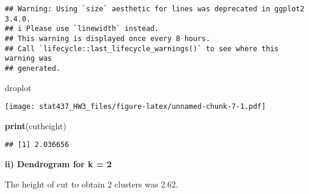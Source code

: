 \documentclass[
]{article}
\newenvironment{Shaded}{\begin{snugshade}}{\end{snugshade}}
\newcommand{\AttributeTok}[1]{\textcolor[rgb]{0.13,0.29,0.53}{#1}}
\newcommand{\CommentTok}[1]{\textcolor[rgb]{0.56,0.35,0.01}{\textit{#1}}}
\newcommand{\DecValTok}[1]{\textcolor[rgb]{0.00,0.00,0.81}{#1}}
\newcommand{\FloatTok}[1]{\textcolor[rgb]{0.00,0.00,0.81}{#1}}
\newcommand{\FunctionTok}[1]{\textcolor[rgb]{0.13,0.29,0.53}{\textbf{#1}}}
\newcommand{\NormalTok}[1]{#1}
\newcommand{\OtherTok}[1]{\textcolor[rgb]{0.56,0.35,0.01}{#1}}
\newcommand{\SpecialCharTok}[1]{\textcolor[rgb]{0.81,0.36,0.00}{\textbf{#1}}}
\newcommand{\StringTok}[1]{\textcolor[rgb]{0.31,0.60,0.02}{#1}}
\begin{document}
\begin{verbatim}
## Warning: Using `size` aesthetic for lines was deprecated in ggplot2 3.4.0.
## i Please use `linewidth` instead.
## This warning is displayed once every 8 hours.
## Call `lifecycle::last_lifecycle_warnings()` to see where this warning was
## generated.
\end{verbatim}

\begin{Shaded}
\begin{Highlighting}[]
\NormalTok{droplot}
\end{Highlighting}
\end{Shaded}

\texttt{[image: stat437\_HW3\_files/figure-latex/unnamed-chunk-7-1.pdf]}

\begin{Shaded}
\begin{Highlighting}[]
\FunctionTok{print}\NormalTok{(cutheight)}
\end{Highlighting}
\end{Shaded}

\begin{verbatim}
## [1] 2.036656
\end{verbatim}

\textbf{ii) Dendrogram for k = 2}

The height of cut to obtain 2 clusters was 2.62.

\begin{Shaded}
\end{Shaded}
\end{document}

